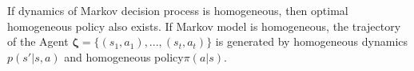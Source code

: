 If dynamics of Markov decision process is homogeneous, then optimal homogeneous policy also exists.
If Markov model is homogeneous, the trajectory of the Agent $\bm{\zeta} = \{ (s_1, a_1), ... , (s_t, a_t) \}$ is generated by homogeneous dynamics $p(s'|s,a)$ and homogeneous policy$\pi(a|s)$.  

